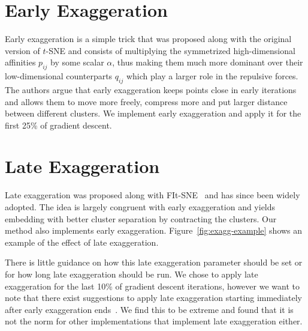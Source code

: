 \section{Early Exaggeration}

Early exaggeration is a simple trick that was proposed along with the original
version of $t$-SNE and consists of multiplying the symmetrized high-dimensional
affinities $p_{ij}$ by some scalar $\alpha$, thus making them much more
dominant over their low-dimensional counterparts $q_{ij}$ which play a larger
role in the repulsive forces. The authors argue that early exaggeration keeps
points close in early iterations and allows them to move more freely, compress
more and put larger distance between different clusters. We implement early
exaggeration and apply it for the first 25\% of gradient descent.

\section{Late Exaggeration}

Late exaggeration was proposed along with FIt-SNE~\cite{fitsne} and has since
been widely adopted. The idea is largely congruent with early exaggeration and
yields embedding with better cluster separation by contracting the clusters.
Our method also implements early exaggeration. Figure~\ref{fig:exagg-example}
shows an example of the effect of late exaggeration.

There is little guidance
on how this late exaggeration parameter should be set or for how long late
exaggeration should be run. We chose to apply late exaggeration for the last
10\% of gradient descent iterations, however we want to note that there exist
suggestions to apply late exaggeration starting immediately after early
exaggeration ends~\cite{arttsne}. We find this to be extreme and found that it
is not the norm for other implementations that implement late exaggeration
either.

